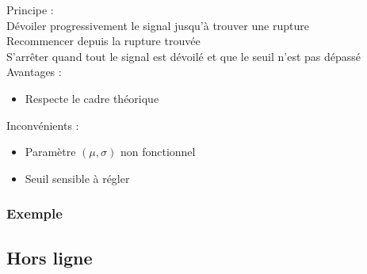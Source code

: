\documentclass{beamer}
\begin{document}
\begin{frame}

	Principe :
	\vspace{.25cm}
	\\
	Dévoiler progressivement le signal jusqu'à trouver une rupture
	\\
	Recommencer depuis la rupture trouvée
	\\
	S'arrêter quand tout le signal est dévoilé et que le seuil n'est pas dépassé
	\\
	\phantom{caca}
	Avantages :
	
	\begin{itemize}
	
		\item Respecte le cadre théorique
		
	\end{itemize}
	
	Inconvénients :
	
	\begin{itemize}
	
		\item Paramètre $(\mu,\sigma)$ non fonctionnel
		
		\item Seuil sensible à régler
		
	\end{itemize}
	
\end{frame}

\begin{frame}
\frametitle{Exemple}
\end{frame}

\subsection{Hors ligne}
\end{document}
